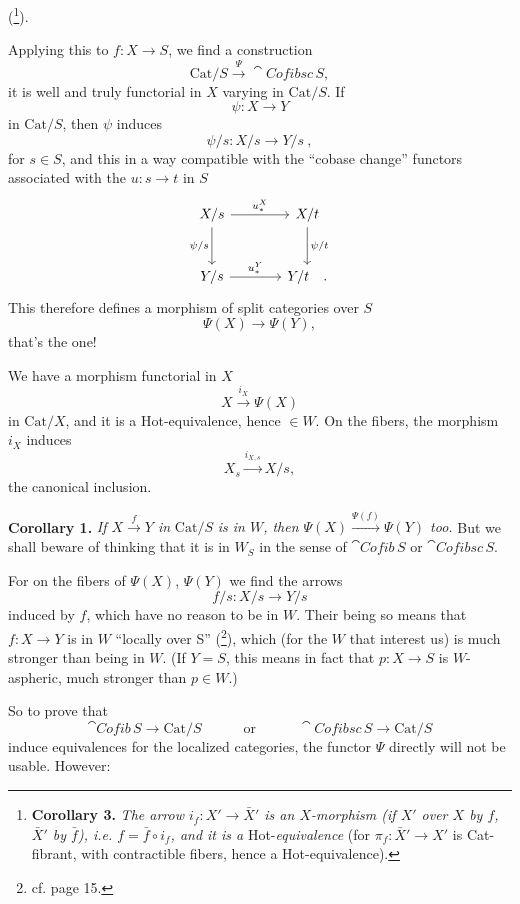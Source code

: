 (\footnote[10]{\textbf{Corollary 3.} \textit{The arrow $i_f : X' \longrightarrow \bar{X}'$ is an $X$-morphism (if $X'$ over $X$ by $f$, $\bar{X}'$ by $\bar{f}$), i.e. $f = \bar{f}\circ i_f$, and it is a} Hot-\textit{equivalence} (for $\pi_f : \bar{X}' \longrightarrow X'$ is Cat-fibrant, with contractible fibers, hence a Hot-equivalence).}).

Applying this to $f : X \longrightarrow S$, we find a construction
\[
\mathrm{Cat}/S \xrightarrow{\Psi} \cat{Cofibsc}\,S,
\]
it is well and truly functorial in $X$ varying in $\mathrm{Cat}/S$. If
\[
\psi : X \longrightarrow Y
\]
in $\mathrm{Cat}/S$, then $\psi$ induces
\[
\psi/s : X/s \longrightarrow Y/s\ ,
\]
for $s \in S$, and this in a way compatible with the
``cobase change'' functors associated with the $u : s \longrightarrow t$ in $S$
\[
\begin{tikzcd}[column sep=large, row sep=large]
X/s \arrow[r, "u_*^X"] \arrow[d, "\psi/s"'] & X/t \arrow[d, "\psi/t"] \\
Y/s \arrow[r, "u_*^Y"] & Y/t \quad .
\end{tikzcd}
\]
This therefore defines a morphism of split categories over $S$
\[
\Psi(X) \longrightarrow \Psi(Y),
\]
that's the one!

We have a morphism functorial in $X$
\[
X \xrightarrow{i_X} \Psi(X)
\]
in $\mathrm{Cat}/X$, and it is a Hot-equivalence, hence $\in W$. On the fibers, the morphism $i_X$ induces
\[
X_s \xrightarrow{i_{X,s}} X/s,
\]
the canonical inclusion.

\textbf{Corollary 1.} \textit{If $X \xrightarrow{f} Y$ in} $\mathrm{Cat}/S$ \textit{is in $W$, then $\Psi(X) \xrightarrow{\Psi(f)} \Psi(Y)$ too.} But we shall beware of thinking that it is in $W_S$ in the sense of $\cat{Cofib}\,S$ or $\cat{Cofibsc}\,S$.

For on the fibers of $\Psi(X)$, $\Psi(Y)$ we find the arrows
\[
f/s : X/s \longrightarrow Y/s
\]
induced by $f$, which have no reason to be in $W$. Their being so means that $f : X \longrightarrow Y$ is in $W$ ``locally over S'' (\footnote[11]{cf.  page 15.}), which (for the $W$ that interest us) is much stronger than being in $W$. (If $Y = S$, this means in fact that $p : X \longrightarrow S$ is $W$-aspheric, much stronger than $p \in W$.)

So to prove that
\[
\cat{Cofib}\,S \longrightarrow \mathrm{Cat}/S \qquad\quad \text{or} \qquad\quad \cat{Cofibsc}\,S \longrightarrow \mathrm{Cat}/S
\]
induce equivalences for the localized categories, the functor $\Psi$ directly will not be usable. However:

